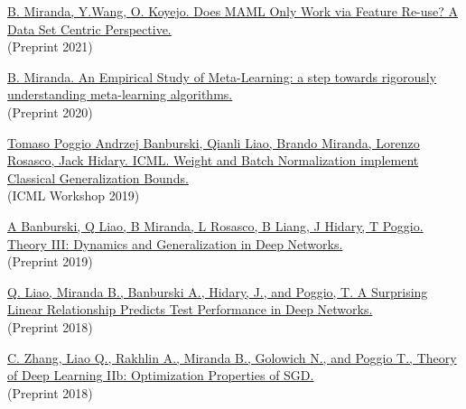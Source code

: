 \documentclass{article}
\newenvironment{changemargin}[2]{%
  \begin{list}{}{%
    \setlength{\topsep}{0pt}%
    \setlength{\leftmargin}{#1}%
    \setlength{\rightmargin}{#2}%
    \setlength{\listparindent}{\parindent}%
    \setlength{\itemindent}{\parindent}%
    \setlength{\parsep}{\parskip}%
  }%
  \item[]}{\end{list}
}
\newenvironment{body} {
	\vspace*{-16pt}
	\begin{changemargin}{-0.25in}{-0.5in}
  }	
	{\end{changemargin}
}
\begin{document}
\begin{body}
    \vspace{10pt}
    \href{https://arxiv.org/abs/2112.13137}
    {B. Miranda, Y.Wang, O. Koyejo.
    Does MAML Only Work via Feature Re-use? A Data Set Centric Perspective.} 
    \\
    (Preprint 2021)
    
    
    \vspace{10pt}
    \href{https://www.ideals.illinois.edu/handle/2142/109139}
    {B. Miranda.
    An Empirical Study of Meta-Learning: a step towards rigorously understanding meta-learning algorithms.}
    \\
    (Preprint 2020)
    
    \vspace{10pt}
    \href{https://drive.google.com/file/d/1G2IVmbENphwB3lxROEpCHQjsClKqRtKP/view}
    {Tomaso Poggio Andrzej Banburski, Qianli Liao, Brando Miranda, Lorenzo Rosasco, Jack Hidary. 
    ICML. 
    Weight and Batch Normalization implement Classical Generalization Bounds.}
    \\
    (ICML Workshop 2019)
    
    \vspace{10pt}
    \href{https://arxiv.org/abs/1903.04991}
    {A Banburski, Q Liao, B Miranda, L Rosasco, B Liang, J Hidary, T Poggio.
    Theory III: Dynamics and Generalization in Deep Networks.}
    \\
    (Preprint 2019)
    
    \vspace{10pt}
    \href{https://arxiv.org/abs/1807.09659}
    {Q. Liao, Miranda B., Banburski A., Hidary, J., and Poggio, T.
    A Surprising Linear Relationship Predicts Test Performance in Deep Networks.}
    \\
    (Preprint 2018)
    
    
    \vspace{10pt}
    \href{https://arxiv.org/abs/1801.02254}
    {C. Zhang, Liao Q., Rakhlin A., Miranda B., Golowich N., and Poggio T., 
    Theory of Deep Learning IIb: Optimization Properties of SGD.}
    \\
    (Preprint 2018)
    

\end{body}
\end{document}
